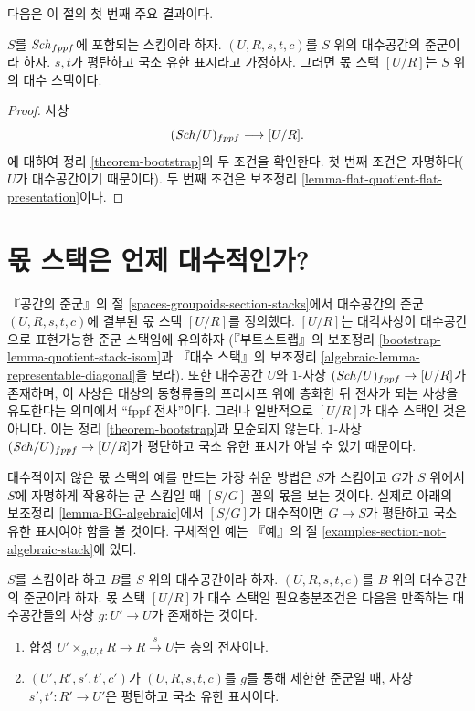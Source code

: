 \noindent
다음은 이 절의 첫 번째 주요 결과이다.

\begin{theorem}
\label{theorem-flat-groupoid-gives-algebraic-stack}
$S$를 $\mathit{Sch}_{fppf}$에 포함되는 스킴이라 하자.
$(U, R, s, t, c)$를 $S$ 위의 대수공간의 준군이라 하자.
$s, t$가 평탄하고 국소 유한 표시라고 가정하자. 그러면 몫 스택
$[U/R]$는 $S$ 위의 대수 스택이다.
\end{theorem}

\begin{proof}
사상
$$
(\mathit{Sch}/U)_{fppf} \longrightarrow [U/R].
$$
에 대하여 정리 \ref{theorem-bootstrap}의 두 조건을 확인한다.
첫 번째 조건은 자명하다($U$가 대수공간이기 때문이다).
두 번째 조건은 보조정리
\ref{lemma-flat-quotient-flat-presentation}이다.
\end{proof}









\section{몫 스택은 언제 대수적인가?}
\label{section-quotient-algebraic}

\noindent
『공간의 준군』의 절 \ref{spaces-groupoids-section-stacks}에서
대수공간의 준군 $(U, R, s, t, c)$에 결부된 몫 스택 $[U/R]$를 정의했다.
$[U/R]$는 대각사상이 대수공간으로 표현가능한 준군 스택임에 유의하자
(『부트스트랩』의 보조정리
\ref{bootstrap-lemma-quotient-stack-isom}과 『대수 스택』의 보조정리
\ref{algebraic-lemma-representable-diagonal}을 보라). 또한 대수공간 $U$와
$1$-사상 $(\mathit{Sch}/U)_{fppf} \to [U/R]$가 존재하며, 이 사상은 대상의
동형류들의 프리시프 위에 층화한 뒤 전사가 되는 사상을 유도한다는
의미에서 ``fppf 전사''이다. 그러나 일반적으로 $[U/R]$가 대수 스택인
것은 아니다. 이는 정리 \ref{theorem-bootstrap}과 모순되지 않는다.
$1$-사상 $(\mathit{Sch}/U)_{fppf} \to [U/R]$가 평탄하고 국소 유한 표시가 아닐
수 있기 때문이다.

\medskip\noindent
대수적이지 않은 몫 스택의 예를 만드는 가장 쉬운 방법은 $S$가 스킴이고
$G$가 $S$ 위에서 $S$에 자명하게 작용하는 군 스킴일 때 $[S/G]$ 꼴의
몫을 보는 것이다. 실제로 아래의 보조정리
\ref{lemma-BG-algebraic}에서 $[S/G]$가 대수적이면 $G \to S$가 평탄하고
국소 유한 표시여야 함을 볼 것이다. 구체적인 예는 『예』의 절
\ref{examples-section-not-algebraic-stack}에 있다.

\begin{lemma}
\label{lemma-quotient-algebraic}
$S$를 스킴이라 하고 $B$를 $S$ 위의 대수공간이라 하자.
$(U, R, s, t, c)$를 $B$ 위의 대수공간의 준군이라 하자.
몫 스택 $[U/R]$가 대수 스택일 필요충분조건은 다음을 만족하는
대수공간들의 사상 $g : U' \to U$가 존재하는 것이다.
\begin{enumerate}
\item 합성 $U' \times_{g, U, t} R \to R \xrightarrow{s} U$는 층의
전사이다.
\item $(U', R', s', t', c')$가 $(U, R, s, t, c)$를 $g$를 통해 제한한
준군일 때, 사상 $s', t' : R' \to U'$은 평탄하고 국소 유한 표시이다.
\end{enumerate}
\end{lemma}

